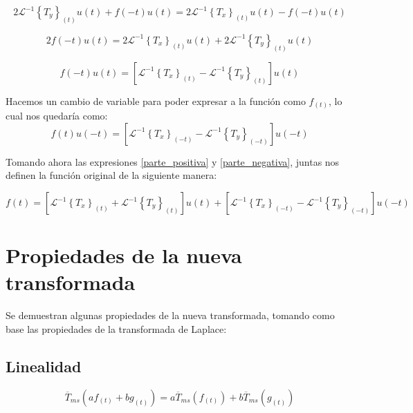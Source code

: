 \documentclass[12pt]{article}
\begin{document}
$$
2 \mathcal{L}^{-1}\left\{T_y\right\}_{(t)} u(t) + f(-t)u(t) = 2 \mathcal{L}^{-1}\left\{T_x\right\}_{(t)} u(t) - f(-t)u(t)
$$

$$
2 f(-t)u(t) = 2 \mathcal{L}^{-1}\left\{T_x\right\}_{(t)} u(t) + 2 \mathcal{L}^{-1}\left\{T_y\right\}_{(t)} u(t)
$$

$$
 f(-t)u(t) =  \left[\mathcal{L}^{-1}\left\{T_x\right\}_{(t)}  - \mathcal{L}^{-1}\left\{T_y\right\}_{(t)} \right] u(t)
$$

Hacemos un cambio de variable para poder expresar a la función como $f_{(t)}$, lo cual nos quedaría como:
\begin{equation}
 f(t)u(-t) =  \left[\mathcal{L}^{-1}\left\{T_x\right\}_{(-t)}  - \mathcal{L}^{-1}\left\{T_y\right\}_{(-t)} \right] u(-t)
\label{parte_negativa}
\end{equation}

Tomando ahora las expresiones \ref{parte_positiva} y \ref{parte_negativa}, juntas nos definen la función original de la siguiente manera:

\begin{equation}
 f(t) = \left[ \mathcal{L}^{-1}\left\{ T_x\right\}_{(t)}+ \mathcal{L}^{-1}\left\{T_y\right\}_{(t)}\right]  u(t) +  \left[\mathcal{L}^{-1}\left\{T_x\right\}_{(-t)}  - \mathcal{L}^{-1}\left\{T_y\right\}_{(-t)} \right] u(-t)
\label{antitransformada}
\end{equation}


\section{Propiedades de la nueva transformada}


Se demuestran algunas propiedades de la nueva transformada, tomando como base las propiedades de la transformada de Laplace:


\subsection{Linealidad}

\begin{equation}
 \overline{T}_{ms}(a f_{(t)} + b g_{(t)}) = a \overline{T}_{ms}(f_{(t)}) + b  \overline{T}_{ms}(g_{(t)})
\label{linealidad}
\end{equation}
\end{document}
